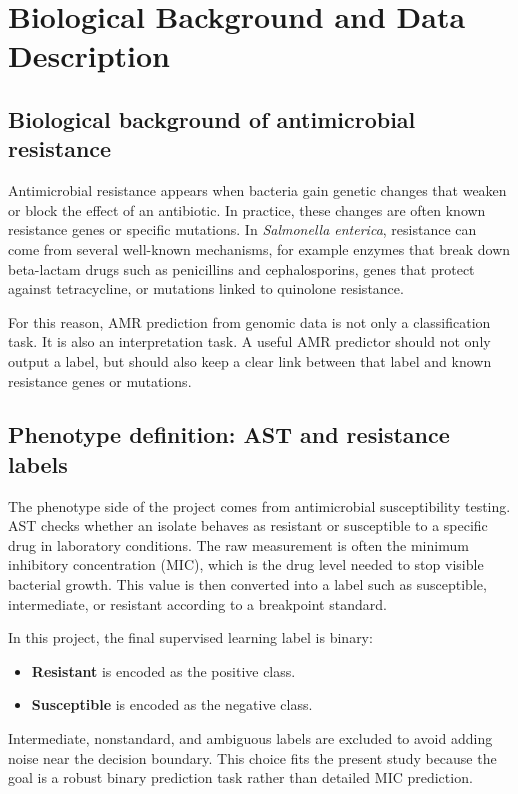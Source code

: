 \chapter{Biological Background and Data Description}

\section{Biological background of antimicrobial resistance}

Antimicrobial resistance appears when bacteria gain genetic changes that weaken or block the effect of an antibiotic. In practice, these changes are often known resistance genes or specific mutations. In \textit{Salmonella enterica}, resistance can come from several well-known mechanisms, for example enzymes that break down beta-lactam drugs such as penicillins and cephalosporins, genes that protect against tetracycline, or mutations linked to quinolone resistance.

For this reason, AMR prediction from genomic data is not only a classification task. It is also an interpretation task. A useful AMR predictor should not only output a label, but should also keep a clear link between that label and known resistance genes or mutations.

\section{Phenotype definition: AST and resistance labels}

The phenotype side of the project comes from antimicrobial susceptibility testing. AST checks whether an isolate behaves as resistant or susceptible to a specific drug in laboratory conditions. The raw measurement is often the minimum inhibitory concentration (MIC), which is the drug level needed to stop visible bacterial growth. This value is then converted into a label such as susceptible, intermediate, or resistant according to a breakpoint standard.

In this project, the final supervised learning label is binary:

\begin{itemize}
    \item \textbf{Resistant} is encoded as the positive class.
    \item \textbf{Susceptible} is encoded as the negative class.
\end{itemize}

Intermediate, nonstandard, and ambiguous labels are excluded to avoid adding noise near the decision boundary. This choice fits the present study because the goal is a robust binary prediction task rather than detailed MIC prediction.

